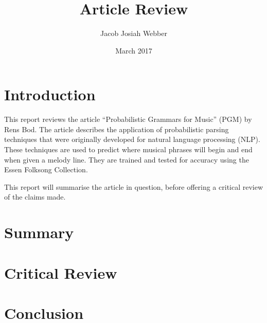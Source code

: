 \documentclass[a4paper,12pt]{article}
\title{Article Review}
\author{Jacob Josiah Webber}
\date{March 2017}
\begin{document}
\maketitle

\section{Introduction}
This report reviews the article ``Probabilistic Grammars for Music'' (PGM) by Rens Bod. The article describes the application of probabilistic parsing techniques that were originally developed for natural language processing (NLP). These techniques are used to predict where musical phrases will begin and end when given a melody line. They are trained and tested for accuracy using the Essen Folksong Collection.

This report will summarise the article in question, before offering a critical review of the claims made.

\section{Summary}



\section{Critical Review}

\section{Conclusion}
 
\end{document}
